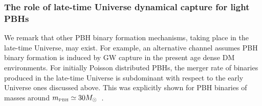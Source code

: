 \documentclass[11pt,a4paper]{article}
\newcommand{\PBH}{\text{\tiny PBH}}
\begin{document}
\subsubsection{The role of late-time Universe dynamical capture for light PBHs}
We remark that other PBH binary formation mechanisms, taking place in the late-time Universe, may exist. 
For example, an alternative channel assumes PBH binary formation is induced by GW capture \cite{1989ApJ...343..725Q,Mouri:2002mc} in the present age dense DM environments. 
For initially Poisson distributed PBHs, the merger rate of binaries produced in the late-time Universe is subdominant with respect to the early Universe ones discussed above. 
This was explicitly shown for PBH binaries of masses around $m_\PBH\simeq 30 M_\odot$~\cite{Ali-Haimoud:2017rtz,Raidal:2017mfl,Korol:2019jud,Vaskonen:2019jpv,DeLuca:2020jug,link}. 
\end{document}
